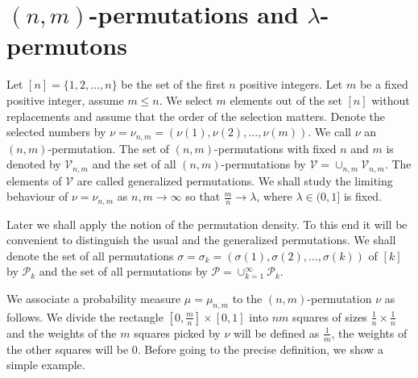 \documentclass[12pt,twoside]{article}
\theoremstyle{definition}
\theoremstyle{remark}
\numberwithin{equation}{section}
\theoremstyle{plain}
\theoremstyle{remark}
\def\PD{{\mathcal P}}                     \def\PDW{{\tilde{\cal P}}}
\def\VD{{\mathcal V}}
\def\PD{{\mathcal P}}
\begin{document}
\section{$(n,m)$-permutations and $\lambda$-permutons} \label{variations}
\setcounter{equation}{0}
%
Let $[n]= \{1,2,\dots , n\}$ be the set of the first $n$ positive integers.
Let $m$ be a fixed positive integer, assume $m\le n$.
We select $m$ elements out of the set $[n]$ without replacements and 
assume that the order of the selection matters.
Denote the selected numbers by $\nu= \nu_{n,m} =(\nu(1), \nu(2), \dots , \nu(m))$.
We call $\nu$ an $(n,m)$-permutation.
The set of $(n,m)$-permutations with fixed $n$ and $m$ is denoted by $\VD_{n,m}$ 
and the set of all $(n,m)$-permutations by $\VD= \cup_{n,m}\VD_{n,m}$.
The elements of $\VD$ are called generalized permutations.
We shall study the limiting behaviour of $\nu= \nu_{n,m}$ as $n,m \to \infty$ so that 
$\frac{m}{n} \to \lambda$, where $\lambda \in (0,1]$ is fixed.

Later we shall apply the notion of the permutation density.
To this end it will be convenient to distinguish the usual and the generalized permutations.
We shall denote the set of all permutations 
$\sigma= \sigma_{k} =(\sigma(1), \sigma(2), \dots , \sigma(k))$
of $[k]$ by $\PD_{k}$ and the set of all permutations
by $\PD= \cup_{k=1}^\infty \PD_{k}$.

We associate a probability measure $\mu =\mu_{n,m}$ to the $(n,m)$-permutation $\nu$ as follows.
We divide the rectangle $[0, \frac{m}{n}] \times [0,1]$ into $nm$ squares of sizes $\frac{1}{n}\times\frac{1}{n}$ 
and the weights of the $m$ squares picked by $\nu$ will be defined as $\frac{1}{m}$,
the weights of the other squares will be $0$.
Before going to the precise definition, we show a simple example.
%
\end{document}
